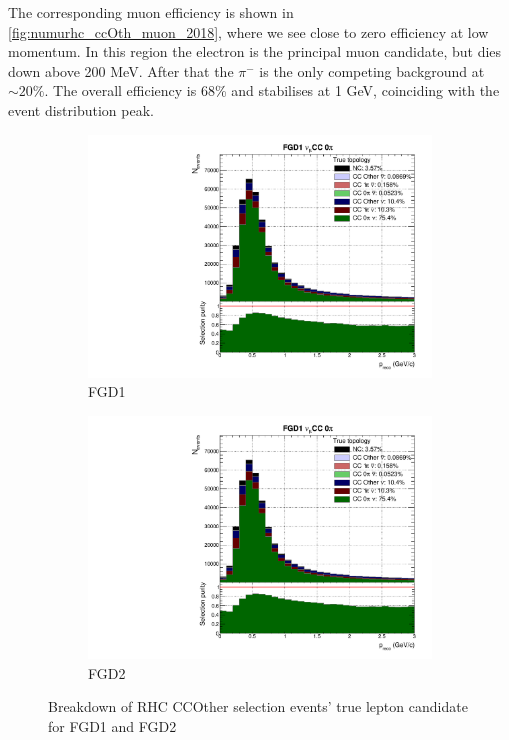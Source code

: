 The corresponding muon efficiency is shown in \autoref{fig:numurhc_ccOth_muon_2018}, where we see close to zero efficiency at low momentum. In this region the electron is the principal muon candidate, but dies down above 200 MeV. After that the $\pi^-$ is the only competing background at $\sim20\%$. The overall efficiency is 68\% and stabilises at 1 GeV, coinciding with the event distribution peak.
\begin{figure}[h]
	\begin{subfigure}[t]{0.49\textwidth}
		\includegraphics[width=\textwidth,page=30, trim={0mm 0mm 0mm 9mm}, clip]{figures/mach3/2018/Selection/2018_RedNDmatrix_rebin_verbose_may_noweights_diagnostics}
		\caption{FGD1}
	\end{subfigure}
	\begin{subfigure}[t]{0.49\textwidth}
		\includegraphics[width=\textwidth,page=36, trim={0mm 0mm 0mm 9mm}, clip]{figures/mach3/2018/Selection/2018_RedNDmatrix_rebin_verbose_may_noweights_diagnostics}
		\caption{FGD2}
	\end{subfigure}
	\caption{Breakdown of \numu RHC CCOther selection events' true lepton candidate for FGD1 and FGD2}
	\label{fig:numurhc_ccOth_muon_2018}
\end{figure}